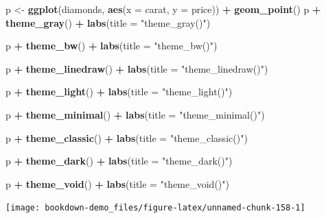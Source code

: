 \documentclass[]{book}
\newenvironment{Shaded}{\begin{snugshade}}{\end{snugshade}}
\newcommand{\KeywordTok}[1]{\textcolor[rgb]{0.13,0.29,0.53}{\textbf{#1}}}
\newcommand{\DataTypeTok}[1]{\textcolor[rgb]{0.13,0.29,0.53}{#1}}
\newcommand{\StringTok}[1]{\textcolor[rgb]{0.31,0.60,0.02}{#1}}
\newcommand{\OperatorTok}[1]{\textcolor[rgb]{0.81,0.36,0.00}{\textbf{#1}}}
\newcommand{\NormalTok}[1]{#1}
\begin{document}
\begin{Shaded}
\begin{Highlighting}[]
\NormalTok{p <-}\StringTok{ }\KeywordTok{ggplot}\NormalTok{(diamonds, }\KeywordTok{aes}\NormalTok{(}\DataTypeTok{x =}\NormalTok{ carat, }\DataTypeTok{y =}\NormalTok{ price)) }\OperatorTok{+}
\StringTok{  }\KeywordTok{geom_point}\NormalTok{() }
\NormalTok{p }\OperatorTok{+}\StringTok{ }\KeywordTok{theme_gray}\NormalTok{() }\OperatorTok{+}
\StringTok{  }\KeywordTok{labs}\NormalTok{(}\DataTypeTok{title =} \StringTok{"theme_gray()"}\NormalTok{)}

\NormalTok{p }\OperatorTok{+}\StringTok{ }\KeywordTok{theme_bw}\NormalTok{() }\OperatorTok{+}
\StringTok{  }\KeywordTok{labs}\NormalTok{(}\DataTypeTok{title =} \StringTok{"theme_bw()"}\NormalTok{)}

\NormalTok{p }\OperatorTok{+}\StringTok{ }\KeywordTok{theme_linedraw}\NormalTok{() }\OperatorTok{+}
\StringTok{  }\KeywordTok{labs}\NormalTok{(}\DataTypeTok{title =} \StringTok{"theme_linedraw()"}\NormalTok{)}

\NormalTok{p }\OperatorTok{+}\StringTok{ }\KeywordTok{theme_light}\NormalTok{() }\OperatorTok{+}
\StringTok{  }\KeywordTok{labs}\NormalTok{(}\DataTypeTok{title =} \StringTok{"theme_light()"}\NormalTok{)}

\NormalTok{p }\OperatorTok{+}\StringTok{ }\KeywordTok{theme_minimal}\NormalTok{() }\OperatorTok{+}
\StringTok{  }\KeywordTok{labs}\NormalTok{(}\DataTypeTok{title =} \StringTok{"theme_minimal()"}\NormalTok{)}

\NormalTok{p }\OperatorTok{+}\StringTok{ }\KeywordTok{theme_classic}\NormalTok{() }\OperatorTok{+}
\StringTok{  }\KeywordTok{labs}\NormalTok{(}\DataTypeTok{title =} \StringTok{"theme_classic()"}\NormalTok{)}

\NormalTok{p }\OperatorTok{+}\StringTok{ }\KeywordTok{theme_dark}\NormalTok{() }\OperatorTok{+}
\StringTok{  }\KeywordTok{labs}\NormalTok{(}\DataTypeTok{title =} \StringTok{"theme_dark()"}\NormalTok{)}

\NormalTok{p }\OperatorTok{+}\StringTok{ }\KeywordTok{theme_void}\NormalTok{() }\OperatorTok{+}
\StringTok{  }\KeywordTok{labs}\NormalTok{(}\DataTypeTok{title =} \StringTok{"theme_void()"}\NormalTok{)}
\end{Highlighting}
\end{Shaded}

\begin{center}\texttt{[image: bookdown-demo\_files/figure-latex/unnamed-chunk-158-1]} \end{center}
\end{document}
